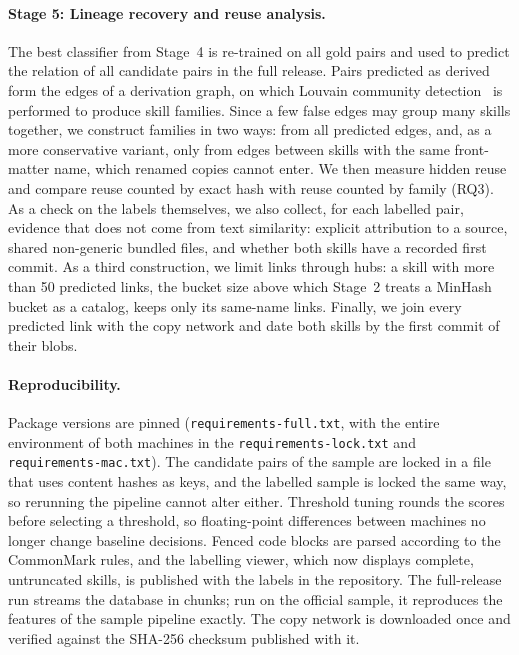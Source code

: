 \documentclass[sigconf,screen]{acmart}
\begin{document}
\paragraph{Stage 5: Lineage recovery and reuse analysis.} The best classifier from Stage~4 is re-trained on all gold pairs and used to predict the relation of all candidate pairs in the full release. Pairs predicted as derived form the edges of a derivation graph, on which Louvain community detection~\cite{blondel2008louvain} is performed to produce skill families. Since a few false edges may group many skills together, we construct families in two ways: from all predicted edges, and, as a more conservative variant, only from edges between skills with the same front-matter name, which renamed copies cannot enter. We then measure hidden reuse and compare reuse counted by exact hash with reuse counted by family (RQ3). As a check on the labels themselves, we also collect, for each labelled pair, evidence that does not come from text similarity: explicit attribution to a source, shared non-generic bundled files, and whether both skills have a recorded first commit. As a third construction, we limit links through hubs: a skill with more than 50 predicted links, the bucket size above which Stage~2 treats a MinHash bucket as a catalog, keeps only its same-name links. Finally, we join every predicted link with the copy network and date both skills by the first commit of their blobs.

\paragraph{Reproducibility.} Package versions are pinned (\texttt{requirements-\allowbreak{}full.txt}, with the entire environment of both machines in the \texttt{requirements-\allowbreak{}lock.txt} and \texttt{requirements-\allowbreak{}mac.txt}). The candidate pairs of the sample are locked in a file that uses content hashes as keys, and the labelled sample is locked the same way, so rerunning the pipeline cannot alter either. Threshold tuning rounds the scores before selecting a threshold, so floating-point differences between machines no longer change baseline decisions. Fenced code blocks are parsed according to the CommonMark rules, and the labelling viewer, which now displays complete, untruncated skills, is published with the labels in the repository. The full-release run streams the database in chunks; run on the official sample, it reproduces the features of the sample pipeline exactly. The copy network is downloaded once and verified against the SHA-256 checksum published with it.
\end{document}
